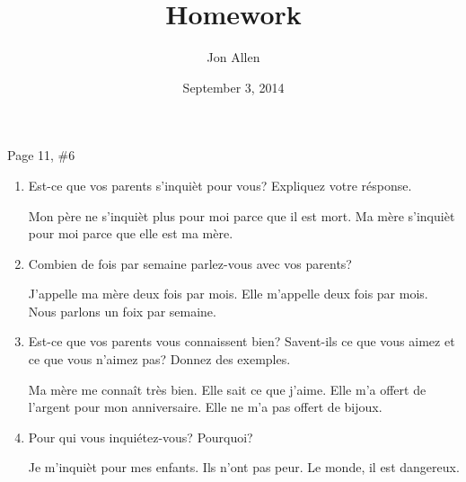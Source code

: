 \documentclass[letterpaper]{article}
\begin{document}
\title{Homework}
\date{September 3, 2014}
\author{Jon Allen}
\maketitle
Page 11, \#6
\renewcommand{\labelenumi}{\arabic{enumi}.}
\renewcommand{\labelenumii}{\arabic{enumii}.}
\renewcommand{\labelenumiii}{(\alph{enumiii})}
\begin{enumerate}
\item
Est-ce que vos parents s'inquièt pour vous? Expliquez votre résponse.

Mon père ne s'inquièt plus pour moi parce que il est mort. Ma mère s'inquièt pour moi parce que elle est ma mère.
\setcounter{enumi}{2}
\item
Combien de fois par semaine parlez-vous avec vos parents?

J'appelle ma mère deux fois par mois. Elle m'appelle deux fois par mois. Nous parlons un foix par semaine.
\item
Est-ce que vos parents vous connaissent bien? Savent-ils ce que vous aimez et ce que vous n'aimez pas? Donnez des exemples.

Ma mère me connaît très bien. Elle sait ce que j'aime. Elle m'a offert de l'argent pour mon anniversaire. Elle ne m'a pas offert de bijoux.
\item
Pour qui vous inquiétez-vous? Pourquoi?

Je m'inquièt pour mes enfants. Ils n'ont pas peur. Le monde, il est dangereux.
\end{enumerate}
\end{document}
